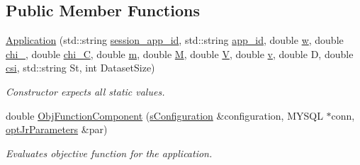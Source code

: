 \subsection*{Public Member Functions}
\begin{DoxyCompactItemize}
\item 
\hyperlink{classApplication_aa660e2135b162cfddaca0918be8599e8}{Application} (std\-::string \hyperlink{classApplication_a5e28ffadb86925ecae57ab18c0085d90}{session\-\_\-app\-\_\-id}, std\-::string \hyperlink{classApplication_a05377e6cdcb9d48f29e0f1972a4a16fe}{app\-\_\-id}, double \hyperlink{classApplication_aead1b7b0150c2a3ebd6c36b1db8c4732}{w}, double \hyperlink{classApplication_a3b9dab40d189989c836b8d328946bbb6}{chi\-\_}, double \hyperlink{classApplication_a46e29a6bfc74de610feec809a77dfb62}{chi\-\_\-\-C}, double \hyperlink{classApplication_ab903d83d3cde51569a27f97752c9f158}{m}, double \hyperlink{classApplication_a14904a2abf46cc0a50eb82043fa0912e}{M}, double \hyperlink{classApplication_aa92ad37e6701931176e0dc9b260fd7ee}{V}, double \hyperlink{classApplication_a9efc167094a42382504dd28a7ac402e0}{v}, double D, double \hyperlink{classApplication_a20adc533c6b6147342b3f60dc0fbd9bc}{csi}, std\-::string St, int Dataset\-Size)
\begin{DoxyCompactList}\small\item\em Constructor expects all static values. \end{DoxyCompactList}\item 
double \hyperlink{classApplication_a97054cee52b315da040098c3927c909e}{Obj\-Function\-Component} (\hyperlink{readConfigurationFile_8hh_ab8f35b1da3261263c5e9c0e7c8921f5c}{s\-Configuration} \&configuration, M\-Y\-S\-Q\-L $\ast$conn, \hyperlink{classoptJrParameters}{opt\-Jr\-Parameters} \&par)
\begin{DoxyCompactList}\small\item\em Evaluates objective function for the application. \end{DoxyCompactList}\end{DoxyCompactItemize}

